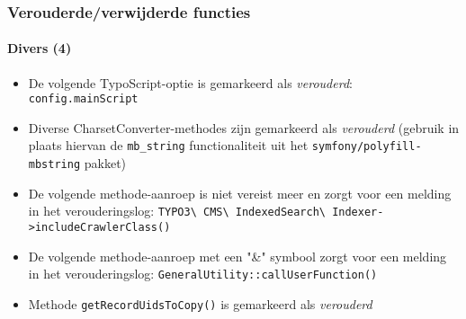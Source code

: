 \begin{frame}[fragile]
	\frametitle{Verouderde/verwijderde functies}
	\framesubtitle{Divers (4)}


	\begin{itemize}

		\item De volgende TypoScript-optie is gemarkeerd als \textit{verouderd}:\newline
			\texttt{config.mainScript}

		\item Diverse CharsetConverter-methodes zijn gemarkeerd als \textit{verouderd}\newline
			\small
				(gebruik in plaats hiervan de \texttt{mb\_string} functionaliteit uit het \texttt{symfony/polyfill-mbstring}
				pakket)
			\normalsize

		\item De volgende methode-aanroep is niet vereist meer en zorgt voor een melding in het verouderingslog:
			\small\texttt{TYPO3\textbackslash
				CMS\textbackslash
				IndexedSearch\textbackslash
				Indexer->includeCrawlerClass()}
			\normalsize

		\item De volgende methode-aanroep met een "\&" symbool zorgt voor een melding in het verouderingslog:
			\small\texttt{GeneralUtility::callUserFunction()}\normalsize

		\item Methode \texttt{getRecordUidsToCopy()} is gemarkeerd als \textit{verouderd}

	\end{itemize}

\end{frame}










